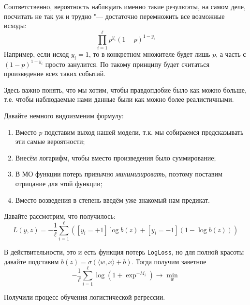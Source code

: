 Соответственно, вероятность наблюдать именно такие результаты, на самом деле, посчитать не так уж и трудно "--- достаточно перемножить все возможные исходы:
\[
\prod_{i=1}^\ell p^{y_i} (1 - p)^{1 - y_i}
\]
Например, если исход $y_i = 1$, то в конкретном множителе будет лишь $p$, а часть с $(1 - p )^{1 - y_i}$ просто занулится. По такому принципу будет считаться произведение всех таких событий.

Здесь важно понять, что мы хотим, чтобы правдопдобие было как можно больше, т.е. чтобы наблюдаемые нами данные были как можно более реалистичными.

Давайте немного видоизменим формулу:
\begin{enumerate}
    \item Вместо $p$ подставим выход нашей модели, т.к. мы собираемся предсказывать эти самые вероятности;
    \item Внесём логарифм, чтобы вместо произведения было суммирование;
    \item В МО функции потерь привычно \textit{минимизировать}, поэтому поставим отрицание для этой функции;
    \item Вместо возведения в степень введём уже знакомый нам предикат.
\end{enumerate}

Давайте рассмотрим, что получилось:
\[
L(y, z) = - \frac{1}{\ell}\sum_{i=1}^\ell ([y_i = +1]\log b(z) + [y_i = -1](1 - \log b(z)))
\]

В действительности, это и есть функция потерь \texttt{LogLoss}, но для полной красоты давайте подставим $b(z) = \sigma(\langle w,x\rangle + b)$. Тогда получим заветное
\[
-\frac{1}{\ell}\sum_{i=1}^\ell \log(1 + \exp^{-M_i}) \rightarrow \min_w
\]

Получили процесс обучения логистической регрессии.